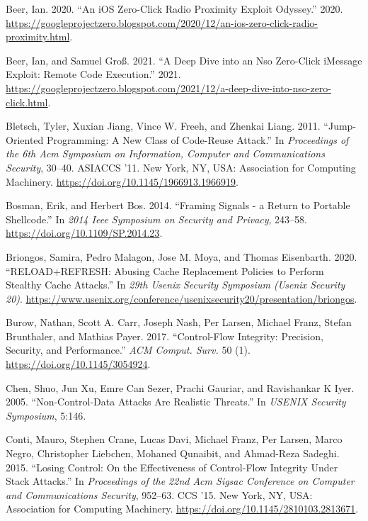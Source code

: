 \documentclass[a4paper,]{report}
\begin{document}
\leavevmode\hypertarget{ref-Beer2020}{}%
Beer, Ian. 2020. ``An iOS Zero-Click Radio Proximity Exploit Odyssey.''
2020.
\url{https://googleprojectzero.blogspot.com/2020/12/an-ios-zero-click-radio-proximity.html}.

\leavevmode\hypertarget{ref-Beer2021}{}%
Beer, Ian, and Samuel Groß. 2021. ``A Deep Dive into an Nso Zero-Click
iMessage Exploit: Remote Code Execution.'' 2021.
\url{https://googleprojectzero.blogspot.com/2021/12/a-deep-dive-into-nso-zero-click.html}.

\leavevmode\hypertarget{ref-Bletsch2011}{}%
Bletsch, Tyler, Xuxian Jiang, Vince W. Freeh, and Zhenkai Liang. 2011.
``Jump-Oriented Programming: A New Class of Code-Reuse Attack.'' In
\emph{Proceedings of the 6th Acm Symposium on Information, Computer and
Communications Security}, 30--40. ASIACCS '11. New York, NY, USA:
Association for Computing Machinery.
\url{https://doi.org/10.1145/1966913.1966919}.

\leavevmode\hypertarget{ref-Bosman2014}{}%
Bosman, Erik, and Herbert Bos. 2014. ``Framing Signals - a Return to
Portable Shellcode.'' In \emph{2014 Ieee Symposium on Security and
Privacy}, 243--58. \url{https://doi.org/10.1109/SP.2014.23}.

\leavevmode\hypertarget{ref-Briongos2020}{}%
Briongos, Samira, Pedro Malagon, Jose M. Moya, and Thomas Eisenbarth.
2020. ``RELOAD+REFRESH: Abusing Cache Replacement Policies to Perform
Stealthy Cache Attacks.'' In \emph{29th Usenix Security Symposium
(Usenix Security 20)}.
\url{https://www.usenix.org/conference/usenixsecurity20/presentation/briongos}.

\leavevmode\hypertarget{ref-Burow2017}{}%
Burow, Nathan, Scott A. Carr, Joseph Nash, Per Larsen, Michael Franz,
Stefan Brunthaler, and Mathias Payer. 2017. ``Control-Flow Integrity:
Precision, Security, and Performance.'' \emph{ACM Comput. Surv.} 50 (1).
\url{https://doi.org/10.1145/3054924}.

\leavevmode\hypertarget{ref-Chen2005}{}%
Chen, Shuo, Jun Xu, Emre Can Sezer, Prachi Gauriar, and Ravishankar K
Iyer. 2005. ``Non-Control-Data Attacks Are Realistic Threats.'' In
\emph{USENIX Security Symposium}, 5:146.

\leavevmode\hypertarget{ref-Conti2015}{}%
Conti, Mauro, Stephen Crane, Lucas Davi, Michael Franz, Per Larsen,
Marco Negro, Christopher Liebchen, Mohaned Qunaibit, and Ahmad-Reza
Sadeghi. 2015. ``Losing Control: On the Effectiveness of Control-Flow
Integrity Under Stack Attacks.'' In \emph{Proceedings of the 22nd Acm
Sigsac Conference on Computer and Communications Security}, 952--63. CCS
'15. New York, NY, USA: Association for Computing Machinery.
\url{https://doi.org/10.1145/2810103.2813671}.
\end{document}

